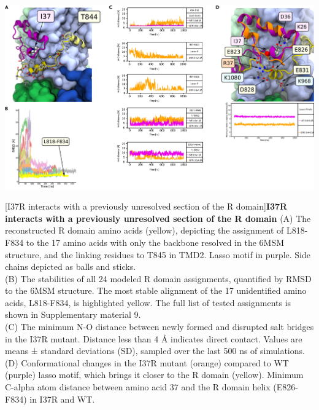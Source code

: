 \begin{center}
\includegraphics[width=\textwidth]{figures/I37R/MD_cftr_2.jpg}
\label{I37R_figure3}
\end{center}
\begingroup
{}[I37R interacts with a previously unresolved section of the R domain]{\textbf{I37R interacts with a previously unresolved section of the R domain}}{
	(A) The reconstructed R domain amino acids (yellow), depicting the assignment of L818-F834 to the 17 amino acids with only the backbone resolved in the 6MSM structure, and the linking residues to T845 in TMD2. Lasso motif in purple. Side chains depicted as balls and sticks.\\

	(B) The stabilities of all 24 modeled R domain assignments, quantified by RMSD to the 6MSM structure. The most stable alignment of the 17 unidentified amino acids, L818-F834, is highlighted yellow. The full list of tested assignments is shown in Supplementary material 9.\\

	(C) The minimum N-O distance between newly formed and disrupted salt bridges in the I37R mutant. Distance less than 4 Å indicates direct contact. Values are means ± standard deviations (SD), sampled over the last 500 ns of simulations.\\

	(D) Conformational changes in the I37R mutant (orange) compared to WT (purple) lasso motif, which brings it closer to the R domain (yellow). Minimum C-alpha atom distance between amino acid 37 and the R domain helix (E826-F834) in I37R and WT.
}

\endgroup

